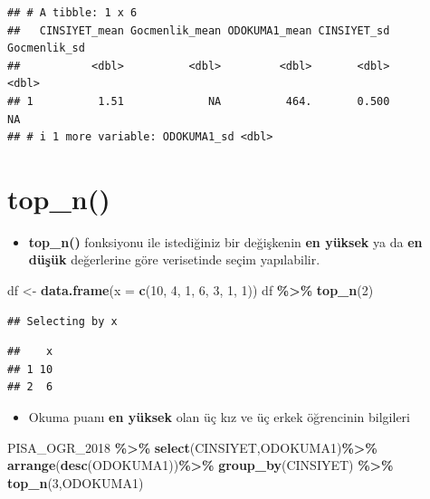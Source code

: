 \documentclass[
  oneside]{book}
\newenvironment{Shaded}{\begin{snugshade}}{\end{snugshade}}
\newcommand{\AttributeTok}[1]{\textcolor[rgb]{0.13,0.29,0.53}{#1}}
\newcommand{\DecValTok}[1]{\textcolor[rgb]{0.00,0.00,0.81}{#1}}
\newcommand{\FunctionTok}[1]{\textcolor[rgb]{0.13,0.29,0.53}{\textbf{#1}}}
\newcommand{\NormalTok}[1]{#1}
\newcommand{\OtherTok}[1]{\textcolor[rgb]{0.56,0.35,0.01}{#1}}
\newcommand{\SpecialCharTok}[1]{\textcolor[rgb]{0.81,0.36,0.00}{\textbf{#1}}}
\providecommand{\tightlist}{%
  \setlength{\itemsep}{0pt}\setlength{\parskip}{0pt}}
\begin{document}
\begin{verbatim}
## # A tibble: 1 x 6
##   CINSIYET_mean Gocmenlik_mean ODOKUMA1_mean CINSIYET_sd Gocmenlik_sd
##           <dbl>          <dbl>         <dbl>       <dbl>        <dbl>
## 1          1.51             NA          464.       0.500           NA
## # i 1 more variable: ODOKUMA1_sd <dbl>
\end{verbatim}

\hypertarget{top_n}{%
\section{top\_n()}\label{top_n}}

\begin{itemize}
\tightlist
\item
  \textbf{top\_n()} fonksiyonu ile istediğiniz bir değişkenin \textbf{en yüksek} ya da \textbf{en düşük} değerlerine göre verisetinde seçim yapılabilir.
\end{itemize}

\begin{Shaded}
\begin{Highlighting}[]
\NormalTok{df }\OtherTok{\textless{}{-}} \FunctionTok{data.frame}\NormalTok{(}\AttributeTok{x =} \FunctionTok{c}\NormalTok{(}\DecValTok{10}\NormalTok{, }\DecValTok{4}\NormalTok{, }\DecValTok{1}\NormalTok{, }\DecValTok{6}\NormalTok{, }\DecValTok{3}\NormalTok{, }\DecValTok{1}\NormalTok{, }\DecValTok{1}\NormalTok{))}
\NormalTok{df }\SpecialCharTok{\%\textgreater{}\%} \FunctionTok{top\_n}\NormalTok{(}\DecValTok{2}\NormalTok{)}
\end{Highlighting}
\end{Shaded}

\begin{verbatim}
## Selecting by x
\end{verbatim}

\begin{verbatim}
##    x
## 1 10
## 2  6
\end{verbatim}

\begin{itemize}
\tightlist
\item
  Okuma puanı \textbf{en yüksek} olan üç kız ve üç erkek öğrencinin bilgileri
\end{itemize}

\begin{Shaded}
\begin{Highlighting}[]
\NormalTok{PISA\_OGR\_2018 }\SpecialCharTok{\%\textgreater{}\%}
  \FunctionTok{select}\NormalTok{(CINSIYET,ODOKUMA1)}\SpecialCharTok{\%\textgreater{}\%} 
  \FunctionTok{arrange}\NormalTok{(}\FunctionTok{desc}\NormalTok{(ODOKUMA1))}\SpecialCharTok{\%\textgreater{}\%} 
  \FunctionTok{group\_by}\NormalTok{(CINSIYET) }\SpecialCharTok{\%\textgreater{}\%} 
  \FunctionTok{top\_n}\NormalTok{(}\DecValTok{3}\NormalTok{,ODOKUMA1)}
\end{Highlighting}
\end{Shaded}
\end{document}
